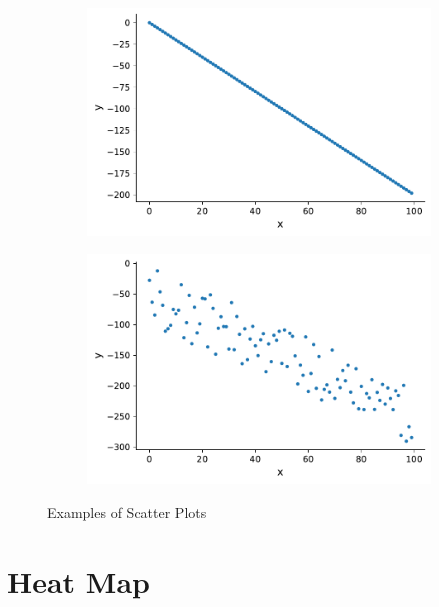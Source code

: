 \documentclass[twoside,12pt]{report}  %
\begin{document}
\begin{figure}[H]
	\begin{subfigure}[b]{0.25\textwidth}
		\includegraphics[width=\textwidth]{./images/scatterplot_strong_negitive_example.pdf}
		\label{scatterplot_example_strong_negative}
	\end{subfigure}
	\begin{subfigure}[b]{0.25\textwidth}
		\includegraphics[width=\textwidth]{./images/scatterplot_weak_negitive_example.pdf}
		\label{scatterplot_example_weak_negative}
	\end{subfigure}
	\caption{Examples of Scatter Plots}
	\label{scatterplot_example}
\end{figure}

\vfill
\pagebreak

\section{Heat Map}
\end{document}
